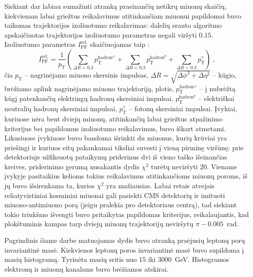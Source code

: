 \documentclass[a4paper, 12pt, oneside]{article}
\newcommand{\pT}{p_{\mathrm{T}}}
\newlength\q
\begin{document}
Siekiant dar labiau sumažinti atranką praeinančių netikrų miuonų skaičių, kiekvienam labai griežtus reikalavimus
atitinkančiam miuonui papildomai buvo taikomas trajektorijos izoliuotumo reikalavimas: dalelių srauto algoritmo
apskaičiuotas trajektorijos izoliuotumo parametras negali viršyti $0.15$.
Izoliuotumo parametras $I^{\mathrm{rel.}}_{\mathrm{PF}}$ skaičiuojamas taip \cite{ParticleFlow}:
\begin{equation}
	\label{eq:isolation}
	I^{\mathrm{rel.}}_{\mathrm{PF}} = \frac{1}{p_{\mathrm{T}}} 
	\left( \sum_{\Delta R<0.3} p_{\mathrm{T}}^{\mathrm{hadron^{\pm}}} +
	\sum_{\Delta R<0.3} p_{\mathrm{T}}^{\mathrm{hadron^0}} + 
	\sum_{\Delta R<0.3} p_{\mathrm{T}}^{\gamma} \right) \; \mathrm{,}
\end{equation}
čia $\pT$ -- nagrinėjamo miuono skersinis impulsas, $\Delta R = \sqrt{\Delta \phi^{2} + \Delta \eta^{2}}$ -- kūgio,
brėžiamo aplink nagrinėjamo miuono trajektoriją, plotis, $p_{\mathrm{T}}^{\mathrm{hadron^{\pm}}}$ -- į nubrėžtą
kūgį patenkančių elektringų hadronų skersiniai impulsai, $p_{\mathrm{T}}^{\mathrm{hadron^0}}$ -- elektriškai neutralių
hadronų skersiniai impulsai,  $p_{\mathrm{T}}^{\gamma}$ -- fotonų skersiniai impulsai.
Įvykiai, kuriuose nėra bent dviejų miuonų, atitinkančių labai griežtus atpažinimo kriterijus bei papildomus izoliuotumo
reikalavimus, buvo iškart atmetami.
Likusiuose įvykiuose buvo bandoma išrinkti du miuonus, kurių krūviai yra priešingi ir kuriuos eitų pakankamai tiksliai
suvesti į vieną pirminę viršūnę: prie detektoriuje užfiksuotų pataikymų priderinus dvi iš vieno taško išeinančias kreives,
priderinimo gerumą nusakantis dydis $\chi^2$ turėtų neviršyti $20$.
Viename įvykyje pasitaikius kelioms tokius reikalavimus atitinkančioms miuonų poroms, iš jų buvo išsirenkama ta, kurios
$\chi^2$ yra mažiausias.
Labai retais atvejais reliatyvistiniai kosminiai miuonai gali pasiekti CMS detektorių ir imituoti miuono-antimiuono porą
(jeigu pralekia pro detektoriaus centrą), tad siekiant tokio triukšmo išvengti buvo pritaikytas papildomas kriterijus,
reikalaujantis, kad plokštuminis kampas tarp dviejų miuonų trajektorijų neviršytų $\pi-0.005$~rad.

Pagrindinis šiame darbe matuojamas dydis buvo atranką praėjusių leptonų porų invariantinė masė.
Kiekvienos leptonų poros invariantinė masė buvo supildoma į masių histogramą.
Tyrinėta masių sritis nuo $15$ iki $3000$~GeV.
Histogramos elektronų ir miuonų kanalams buvo brėžiamos atskirai.
\end{document}
